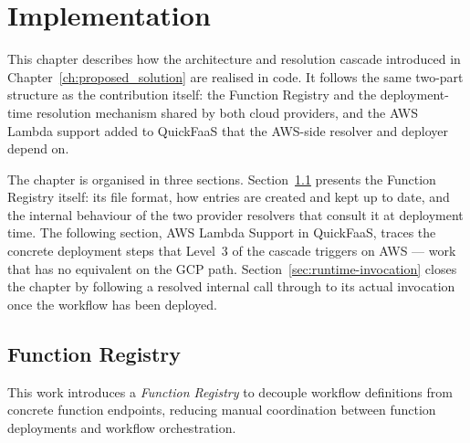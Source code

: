 % 
%  
%
\chapter{Implementation}
\label{cha:impl}

This chapter describes how the architecture and resolution cascade introduced in
Chapter~\ref{ch:proposed_solution} are realised in code. It follows the same two-part structure
as the contribution itself: the Function Registry and the deployment-time resolution mechanism
shared by both cloud providers, and the AWS Lambda support added to QuickFaaS that the
AWS-side resolver and deployer depend on.

The chapter is organised in three sections. Section~\ref{sec:function-registry} presents the
Function Registry itself: its file format, how entries are created and kept up to date, and the
internal behaviour of the two provider resolvers that consult it at deployment time. The
following section, AWS Lambda Support in QuickFaaS, traces the concrete deployment steps that
Level~3 of the cascade triggers on AWS --- work that has no equivalent on the GCP path.
Section~\ref{sec:runtime-invocation} closes the chapter by following a resolved internal call
through to its actual invocation once the workflow has been deployed.

\section{Function Registry}
\label{sec:function-registry}

This work introduces a \textit{Function Registry} to decouple workflow definitions from concrete function endpoints, reducing manual coordination between function deployments and workflow orchestration.

